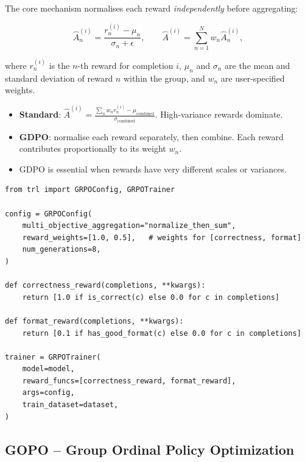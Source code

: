 The core mechanism normalises each reward \emph{independently} before aggregating:

\[
\boxed{
    \hat{A}_n^{(i)} = \frac{r_n^{(i)} - \mu_n}{\sigma_n + \epsilon}, \qquad
    \hat{A}^{(i)} = \sum_{n=1}^N w_n \hat{A}_n^{(i)},
  }
\]

where $r_n^{(i)}$ is the $n$-th reward for completion $i$, $\mu_n$ and $\sigma_n$ are the mean and standard deviation of reward $n$ within the group, and $w_n$ are user-specified weights.

\begin{keybox}
\begin{itemize}
  \item \textbf{Standard}: $\hat{A}^{(i)} = \frac{\sum_n w_n r_n^{(i)} - \mu_{\text{combined}}}{\sigma_{\text{combined}}}$. High-variance rewards dominate.
  \item \textbf{GDPO}: normalise each reward separately, then combine. Each reward contributes proportionally to its weight $w_n$.
  \item GDPO is essential when rewards have very different scales or variances.
\end{itemize}
\end{keybox}

\begin{examplebox}
\begin{lstlisting}[style=pythonstyle]
from trl import GRPOConfig, GRPOTrainer

config = GRPOConfig(
    multi_objective_aggregation="normalize_then_sum",
    reward_weights=[1.0, 0.5],   # weights for [correctness, format]
    num_generations=8,
)

def correctness_reward(completions, **kwargs):
    return [1.0 if is_correct(c) else 0.0 for c in completions]

def format_reward(completions, **kwargs):
    return [0.1 if has_good_format(c) else 0.0 for c in completions]

trainer = GRPOTrainer(
    model=model,
    reward_funcs=[correctness_reward, format_reward],
    args=config,
    train_dataset=dataset,
)
\end{lstlisting}
\end{examplebox}

\subsection{GOPO -- Group Ordinal Policy Optimization}
\label{gopo-group-ordinal-policy-optimization}

